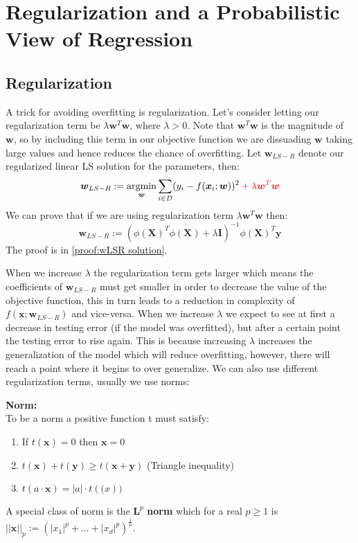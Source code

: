 \section{Regularization and a Probabilistic View of Regression}

\subsection{Regularization}
A trick for avoiding overfitting is regularization. Let's consider letting our regularization term be $\lambda \bm{w}^{T} \bm{w}$, where $\lambda >0$. Note that $ \bm{w}^{T} \bm{w}$ is the magnitude of $\bm{w}$, so by including this term in our objective function we are dissuading $\bm{w}$ taking large values and hence reduces the chance of overfitting. Let $\bm{w}_{LS-R}$ denote our regularized linear LS solution for the parameters, then:
\begin{equation}
    \bm{w}_{LS-R} := \operatorname*{arg\!\min}_{\bm{w}} \sum_{i \in D} (y_{i}-f(\bm{x}_{i};\bm{w}))^{2} \color{red} + \lambda \bm{w}^{T} \bm{w} \color{black}
\end{equation}
We can prove that if we are using regularization term $\lambda \bm{w}^{T} \bm{w}$ then:
\begin{equation}\label{eqn:w-LS-R solution}
    \bm{w}_{LS-R} := (\phi(\bm{X})^{T} \phi(\bm{X}) + \lambda \bm{I})^{-1} \phi(\bm{X})^{T} \bm{y}
\end{equation}
The proof is in \cref{proof:wLSR solution}.

When we increase $\lambda$ the regularization term gets larger which means the coefficients of $\bm{w}_{LS-R}$ must get smaller in order to decrease the value of the objective function, this in turn leads to a reduction in complexity of $f(\bm{x};\bm{w}_{LS-R})$ and vice-versa. When we increase $\lambda$ we expect to see at first a decrease in testing error (if the model was overfitted), but after a certain point the testing error to rise again. This is because increasing $\lambda$ increases the generalization of the model which will reduce overfitting, however, there will reach a point where it begins to over generalize. We can also use different regularization terms, usually we use norms:
\begin{definition}
    \textbf{Norm:} \\
    To be a norm  a positive function t must satisfy:
    \begin{enumerate}
        \item If $t(\bm{x}) = 0$ then $\bm{x}=0$
        \item $t(\bm{x}) + t(\bm{y}) \geq t(\bm{x} + \bm{y})$ (Triangle inequality)
        \item $t(a \cdot \bm{x}) = |a| \cdot t(\bm(x))$
    \end{enumerate}
\end{definition}
A special class of norm is the $\bm{L}^{p}$ \textbf{norm} which for a real $p \geq 1$ is $||\bm{x}||_{p} := (|x_{1}|^{p} + ... + |x_{d}|^{p})^{\frac{1}{p}}$. 

